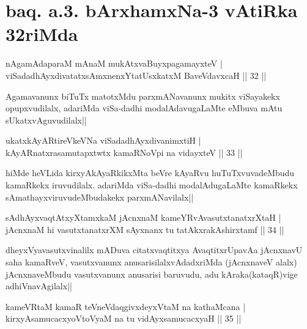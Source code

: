 \section*{baq. a.3. bArxhamxNa-3 vAtiRka 32riMda}

\begin{shl}
nA\s \s gamAdaparaM mAnaM mukAtxvaBuyxpagamayxteV |\\
viSadadhAyxdivatatxsAmxnenxYtatUsxkatxM BaveVdavxcaH \hfill || 32 ||
\end{shl}

\begin{artha}
Agamavanunx biTuTx matotxMdu parxmANavanunx mukitx viSayakekx opupxvudilalx, adariMda 
viSa-dadhi modalAdavugaLaMte eMbuva mAtu sUkatxvAguvudilalx||
\end{artha}


\begin{shl}
ukatxkAyARtireVkeVNa viSadadhAyxdivanimxtiH |\\
kAyARnatxrasamutapxtwtx kamaRNoV\s pi na vidayxteV \hfill || 33 ||
\end{shl}

\begin{artha}
hiMde heVLida kirxyAkAyaRkikxMta beVre kAyaRvu huTuTxvuvadeMbudu kamaRkekx iruvudilalx. adariMda viSa-dadhi modalAdugaLaMte kamaRkekx sAmathayxviruvudeMbudakekx parxmANavilalx||
\end{artha}


\begin{shl}
sAdhAyxvaqtAtxyXtamxkaM jAcnxnaM kameYRvAvasutxtanatxrXtaH |\\
jAcnxnaM hi vasutxtanatxrXM sAyxnanx tu tatAkxrakAshirxtamf \hfill || 34 ||
\end{shl}

\begin{artha}
dheyxVyavasutxvinalilx mADuva citatxvaqtitxya AvaqtitxrUpavAa jAcnxnavU saha kamaRveV, vasutxvanunx anusarisilalxvAdadxriMda (jAcnxnaveV alalx) jAcnxnaveMbudu vasutxvanunx anusarisi baruvudu, adu kAraka(kataqR)vige adhiVnavAgilalx||
\end{artha}

\begin{shl}
kameVRtaM kamaR teVneVdaqgivxdeyxVtaM na kathaMcana |\\
kirxyAsamucacxyoV\s toV\s yaM na tu vidAyxsamucacxyaH \hfill || 35 ||
\end{shl}

